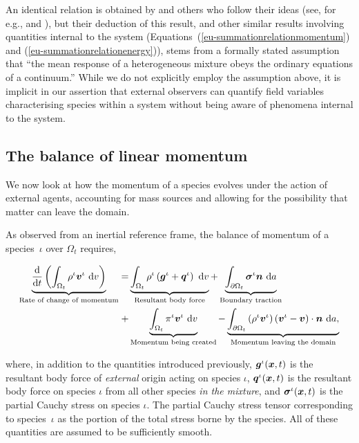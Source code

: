 An identical relation is obtained by \citet{TruesdellToupin:60} and
others who follow their ideas (see, for e.g., \cite{passmanetal} and
\cite{ateshian07}), but their deduction of this result, and other
similar results involving quantities internal to the system
(Equations~(\ref{eu-summationrelationmomentum}) and
(\ref{eu-summationrelationenergy})), stems from a formally stated
assumption that ``the mean response of a heterogeneous mixture obeys
the ordinary equations of a continuum.'' While we do not explicitly
employ the assumption above, it is implicit in our assertion that
external observers can quantify field variables characterising species
within a system without being aware of phenomena internal to the
system.

\subsection{The balance of linear momentum}
\label{eu-balance-of-linear-momentum}

We now look at how the momentum of a species evolves under the action
of external agents, accounting for mass sources and allowing for the
possibility that matter can leave the domain.

As observed from an inertial reference frame, the balance of momentum
of a species~$\iota$ over $\Omega_{t}$ requires,

\begin{equation}
\begin{split}
\underbrace{\frac{\mathrm{d}}{\mathrm{d}t}\left(\int_{\Omega_{t}}
  \rho^{\iota} \mbox{\boldmath$ v$}^{\iota}\ \mathrm{d}v \right)}_{\text{Rate of change
    of momentum}} = & \underbrace{\int_{\Omega_{t}} \rho^{\iota}
  \left(\mbox{\boldmath$ g$}^{\iota} +
  \mbox{\boldmath$ q$}^{\iota}\right)\ \mathrm{d}v}_{\text{Resultant body force}} +
\underbrace{\int_{\partial \Omega_{t}}
  \mbox{\boldmath$\sigma$}^{\iota}\mbox{\boldmath$ n$}\ \mathrm{d}a}_{\text{Boundary traction}}\\ +
& \underbrace{\int_{\Omega_{t}}
  \pi^{\iota}\mbox{\boldmath$ v$}^{\iota}\ \mathrm{d}v}_{\text{Momentum being created}}
- \underbrace{\int_{\partial \Omega_{t}} \left(\rho^{\iota}
  \mbox{\boldmath$ v$}^{\iota} \right) \left(\mbox{\boldmath$ v$}^{\iota} - \mbox{\boldmath$ v$}\right) \cdot
  \mbox{\boldmath$ n$}\ \mathrm{d}a,}_{\text{Momentum leaving the domain}}
\end{split}
\label{eu-globalbalanceofmomentum}
\end{equation}

\noindent where, in addition to the quantities introduced previously,
$\mbox{\boldmath$ g$}^{\iota}(\mbox{\boldmath$ x$},t)$ is the resultant body force of {\em external}
origin acting on species $\iota$, $\mbox{\boldmath$ q$}^{\iota}(\mbox{\boldmath$ x$},t)$ is the
resultant body force on species $\iota$ from all other species {\em in
  the mixture}, and $\mbox{\boldmath$\sigma$}^{\iota}(\mbox{\boldmath$ x$},t)$ is the partial Cauchy
stress on species $\iota$. The partial Cauchy stress tensor
corresponding to species~$\iota$ as the portion of the total stress
borne by the species. All of these quantities are assumed to be
sufficiently smooth.

